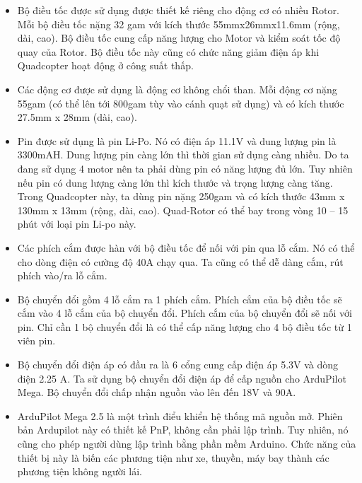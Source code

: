 \begin{itemize}
\item Bộ điều tốc được sử dụng được thiết kế riêng cho động cơ có nhiều Rotor. Mỗi bộ điều tốc nặng 32 gam với kích thước 55mmx26mmx11.6mm (rộng, dài, cao). Bộ điều tốc cung cấp năng lượng cho Motor và kiểm soát tốc độ quay của Rotor. Bộ điều tốc này cũng có chức năng giảm điện áp khi Quadcopter hoạt động ở công suất thấp.

\item Các động cơ được sử dụng là động cơ không chổi than. Mỗi động cơ nặng 55gam (có thể lên tới 800gam tùy vào cánh quạt sử dụng) và có kích thước 27.5mm x 28mm (dài, cao).

\item Pin được sử dụng là pin Li-Po. Nó có điện áp 11.1V và dung lượng pin là 3300mAH. Dung lượng pin càng lớn thì thời gian sử dụng càng nhiều. Do ta đang sử dụng 4 motor nên ta phải dùng pin có năng lượng đủ lớn. Tuy nhiên nếu pin có dung lượng càng lớn thì kích thước và trọng lượng càng tăng. Trong Quadcopter này, ta dùng pin nặng 250gam và có kích thước 43mm x 130mm x 13mm (rộng, dài, cao). Quad-Rotor có thể bay trong vòng 10 – 15 phút với loại pin Li-po này.

\item Các phích cắm được hàn với bộ điều tốc để nối với pin qua lỗ cắm. Nó có thể cho dòng điện có cường độ 40A chạy qua. Ta cũng có thể dễ dàng cắm, rút phích vào/ra lỗ cắm.

\item Bộ chuyển đổi gồm 4 lỗ cắm ra 1 phích cắm. Phích cắm của bộ điều tốc sẽ cắm vào 4 lỗ cắm của bộ chuyển đổi. Phích cắm của bộ chuyển đổi sẽ nối với pin. Chỉ cần 1 bộ chuyển đổi là có thể cấp năng lượng cho 4 bộ điều tốc từ 1 viên pin.

\item Bộ chuyển đổi điện áp có đầu ra là 6 cổng cung cấp điện áp 5.3V và dòng điện 2.25 A. Ta sử dụng bộ chuyển đổi điện áp để cấp nguồn cho ArduPilot Mega. Bộ chuyển đổi chấp nhận nguồn vào lên đến 18V và 90A.

\item ArduPilot Mega 2.5 là một trình điểu khiển hệ thống mã nguồn mở. Phiên bản Ardupilot này có thiết kế PnP, không cần phải lập trình. Tuy nhiên, nó cũng cho phép người dùng lập trình bằng phần mềm Arduino. Chức năng của thiết bị này là biến các phương tiện như xe, thuyền, máy bay thành các phương tiện không người lái.


\end{itemize}
